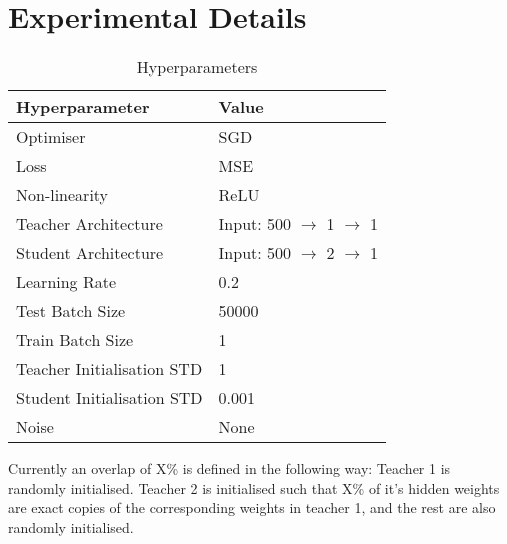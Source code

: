 \documentclass{article}
\begin{document}

\newpage

\section{Experimental Details}

\begin{table}[ht]
    \centering\small
    \caption{Hyperparameters}
        \begin{tabularx}{\linewidth}{lX} 
            \toprule
            Hyperparameter & Value\\
            \midrule
            Optimiser& SGD  \\
            Loss& MSE \\ 
            Non-linearity& ReLU\\
            Teacher Architecture& Input: 500 $\to$ 1 $\to$ 1\\
            Student Architecture& Input: 500 $\to$ 2 $\to$ 1\\
            Learning Rate& 0.2 \\
            Test Batch Size&50000\\
            Train Batch Size& 1   \\
            Teacher Initialisation STD& 1   \\
            Student Initialisation STD& 0.001   \\ 
            Noise& None\\ 
            \bottomrule
    \end{tabularx}
\end{table} 

Currently an overlap of X\% is defined in the following way:
Teacher 1 is randomly initialised. Teacher 2 is initialised such that X\%
of it's hidden weights are exact copies of the corresponding weights in teacher
1, and the rest are also randomly initialised. 
\end{document}
